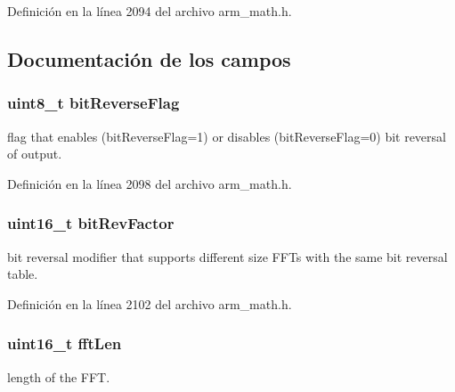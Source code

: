 Definición en la línea 2094 del archivo arm\+\_\+math.\+h.



\subsection{Documentación de los campos}
\subsubsection[{\texorpdfstring{bit\+Reverse\+Flag}{bitReverseFlag}}]{\setlength{\rightskip}{0pt plus 5cm}uint8\+\_\+t bit\+Reverse\+Flag}\hypertarget{structarm__cfft__radix4__instance__f32_a09a221a818c6d0e064557a99e2fe9a8b}{}\label{structarm__cfft__radix4__instance__f32_a09a221a818c6d0e064557a99e2fe9a8b}
flag that enables (bit\+Reverse\+Flag=1) or disables (bit\+Reverse\+Flag=0) bit reversal of output. 

Definición en la línea 2098 del archivo arm\+\_\+math.\+h.

\subsubsection[{\texorpdfstring{bit\+Rev\+Factor}{bitRevFactor}}]{\setlength{\rightskip}{0pt plus 5cm}uint16\+\_\+t bit\+Rev\+Factor}\hypertarget{structarm__cfft__radix4__instance__f32_a33386d95319dc3ee7097b3a8e52e01ec}{}\label{structarm__cfft__radix4__instance__f32_a33386d95319dc3ee7097b3a8e52e01ec}
bit reversal modifier that supports different size F\+F\+Ts with the same bit reversal table. 

Definición en la línea 2102 del archivo arm\+\_\+math.\+h.

\subsubsection[{\texorpdfstring{fft\+Len}{fftLen}}]{\setlength{\rightskip}{0pt plus 5cm}uint16\+\_\+t fft\+Len}\hypertarget{structarm__cfft__radix4__instance__f32_ab8db3bbe7c61e6bb8ca2a55e3446e11a}{}\label{structarm__cfft__radix4__instance__f32_ab8db3bbe7c61e6bb8ca2a55e3446e11a}
length of the F\+FT. 

